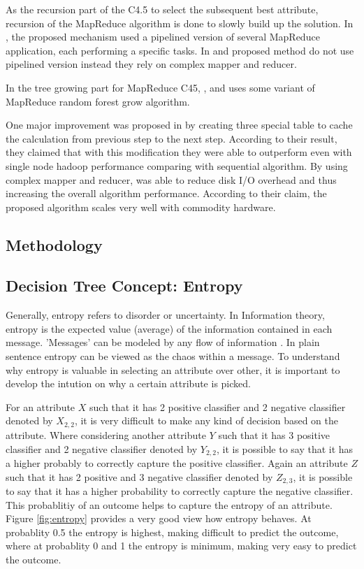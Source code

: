 \documentclass{article}
\begin{document}
\BlankLine
As the recursion part of the C4.5 to select the subsequent best attribute, recursion of the MapReduce algorithm is done to slowly build up the solution. In \cite{c45cn}, the proposed mechanism used a pipelined version of several MapReduce application, each performing a specific tasks. In \cite{c452017} and \cite{c45in} proposed method do not use pipelined version instead they rely on complex mapper and reducer.

\BlankLine
In the tree growing part for MapReduce C45, \cite{c452017}, \cite{c45cn} and \cite{c45in} uses some variant of MapReduce random forest grow algorithm.

\BlankLine
One major improvement was proposed in \cite{c45cn} by creating three special table to cache the calculation from previous step to the next step. According to their result, they claimed that with this modification they were able to outperform even with single node hadoop performance comparing with sequential algorithm. By using complex mapper and reducer, \cite{c452017} was able to reduce disk I/O overhead and thus increasing the overall algorithm performance. According to their claim, the proposed algorithm scales very well with commodity hardware.

\subsection{Methodology}

\subsection{Decision Tree Concept: Entropy}
Generally, entropy refers to disorder or uncertainty. In Information theory, entropy is the expected value (average) of the information contained in each message. 'Messages' can be modeled by any flow of information \cite{wikientropy}. In plain sentence entropy can be viewed as the chaos within a message. To understand why entropy is valuable in selecting an attribute over other, it is important to develop the intution on why a certain attribute is picked.

For an attribute ${X}$ such that it has 2 positive classifier and 2 negative classifier denoted by ${X_{2,2}}$, it is very difficult to make any kind of decision based on the attribute. Where considering another attribute ${Y}$ such that it has 3 positive classifier and 2 negative classifier denoted by ${Y_{2,2}}$, it is possible to say that it has a higher probably to correctly capture the positive classifier. Again an attribute ${Z}$ such that it has 2 positive and 3 negative classifier denoted by ${Z_{2,3}}$, it is possible to say that it has a higher probability to correctly capture the negative classifier. This probablitiy of an outcome helps to capture the entropy of an attribute. Figure \ref{fig:entropy} provides a very good view how entropy behaves. At probablity 0.5 the entropy is highest, making difficult to predict the outcome, where at probablity  0 and 1 the entropy is minimum, making very easy to predict the outcome.
\end{document}
